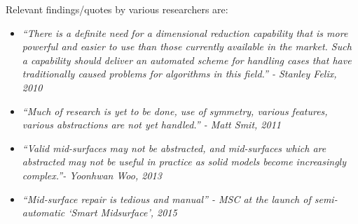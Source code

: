 Relevant findings/quotes by various researchers are:
	\begin{itemize}[noitemsep,topsep=2pt,parsep=2pt,partopsep=2pt]
	\item {\em``There is a definite need for a dimensional reduction capability that is more powerful and easier to use than those currently available in the market. Such a capability should deliver an automated scheme for handling cases that have traditionally caused problems for algorithms in this field.'' - Stanley Felix, 2010 } \cite{Stanley2010}
	\item {\em ``Much of research is yet to be done, use of symmetry, various features, various abstractions are not yet handled.'' - Matt Smit, 2011 } \cite{Smit2011}
	\item {\em  ``Valid mid-surfaces may not be abstracted, and mid-surfaces which are abstracted may not be useful in practice as solid models become increasingly complex.''- Yoonhwan Woo, 2013 \cite{Woo2013}}
	\item {\em  ``Mid-surface repair is tedious and manual'' - MSC at the launch of  semi-automatic `Smart Midsurface', 2015 \cite{Msc2015}}
	\end{itemize}
	

